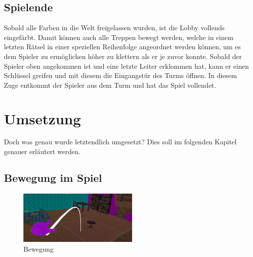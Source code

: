 \section{Spielende}
Sobald alle Farben in die Welt freigelassen wurden, ist die Lobby vollends eingefärbt. Damit können auch alle Treppen bewegt werden, welche in einem letzten Rätsel in einer speziellen Reihenfolge angeordnet werden können, um es dem Spieler zu ermöglichen höher zu klettern als er je zuvor konnte. Sobald der Spieler oben angekommen ist und eine letzte Leiter erklommen hat, kann er einen Schlüssel greifen und mit diesem die Eingangstür des Turms öffnen. In diesem Zuge entkommt der Spieler aus dem Turm und hat das Spiel vollendet.


\chapter{Umsetzung}
Doch was genau wurde letztendlich umgesetzt? Dies soll im folgenden Kapitel genauer erläutert werden.

\section{Bewegung im Spiel}
\begin{figure}
	\vspace*{-0.5cm}
	\includegraphics[width=5.9cm]{Pictures/Bewegung}
	\caption{Bewegung}
	\vspace*{0cm}
	\label{fig:bewegung}
\end{figure}

